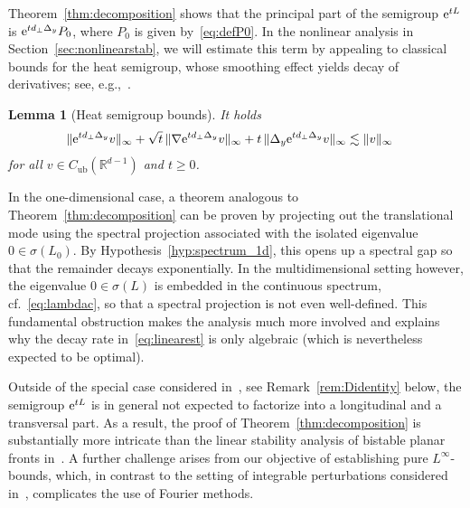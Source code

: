 \documentclass[12pt,oneside,a4paper,reqno]{amsart}
\numberwithin{equation}{section}
\newtheorem{lemma}[theorem]{Lemma}
\theoremstyle{definition}
\theoremstyle{remark}
\newcommand{\bbR}{{\mathbb R}}
\newcommand{\Cub}{{C_{\mathrm{ub}}}}
\newcommand{\re}{{\rm e}}
\DeclarePairedDelimiter{\norm}{\lVert}{\rVert}
\begin{document}
Theorem~\ref{thm:decomposition} shows that the principal part of the semigroup $\re^{tL}$ is $\re^{t d_{\perp}\Delta_y} P_0$, where $P_0$ is given by~\eqref{eq:defP0}. 
In the nonlinear analysis in Section~\ref{sec:nonlinearstab}, we will estimate this term by appealing to classical bounds for the heat semigroup, whose smoothing effect yields decay of derivatives; see, e.g.,~\cite[p.~3537]{matano_large_2011}.

\begin{lemma}[Heat semigroup bounds]
    \label{lem:heat}
    It holds
    \begin{align}
        \label{eq:heat1}
        \norm{\re^{t d_{\bot}\Delta_y} v}_{\infty} + \sqrt{t} \, \norm{\nabla \re^{t d_{\bot}\Delta_y} v}_{\infty} + t\, \norm{\Delta_y \re^{t d_{\bot}\Delta_y} v}_{\infty} &\lesssim \norm{v}_{\infty}
    \end{align}
    for all $v \in \Cub(\bbR^{d-1})$ and $t \geq 0$.
\end{lemma}

In the one-dimensional case, a theorem analogous to Theorem~\ref{thm:decomposition} can be proven by projecting out the translational mode using the spectral projection associated with the isolated eigenvalue $0 \in \sigma(L_0)$.
By Hypothesis~\ref{hyp:spectrum_1d}, this opens up a spectral gap so that the remainder decays exponentially.
In the multidimensional setting however, the eigenvalue $0 \in \sigma(L)$ is embedded in the continuous spectrum, cf.~\eqref{eq:lambdac}, so that a spectral projection is not even well-defined.
This fundamental obstruction makes the analysis much more involved and explains why the decay rate in~\eqref{eq:linearest} is only algebraic (which is nevertheless expected to be optimal).

Outside of the special case considered in~\cite{kapitula_multidimensional_1997}, see Remark~\ref{rem:Didentity} below, the semigroup $\re^{tL}$ is in general not expected to factorize into a longitudinal and a transversal part.
As a result, the proof of Theorem~\ref{thm:decomposition} is substantially more intricate than the linear stability analysis of bistable planar fronts in~\cite{kapitula_multidimensional_1997}. 
A further challenge arises from our objective of establishing pure $L^\infty$-bounds, which, in contrast to the setting of integrable perturbations considered in~\cite{kapitula_multidimensional_1997}, complicates the use of Fourier methods.
\end{document}
